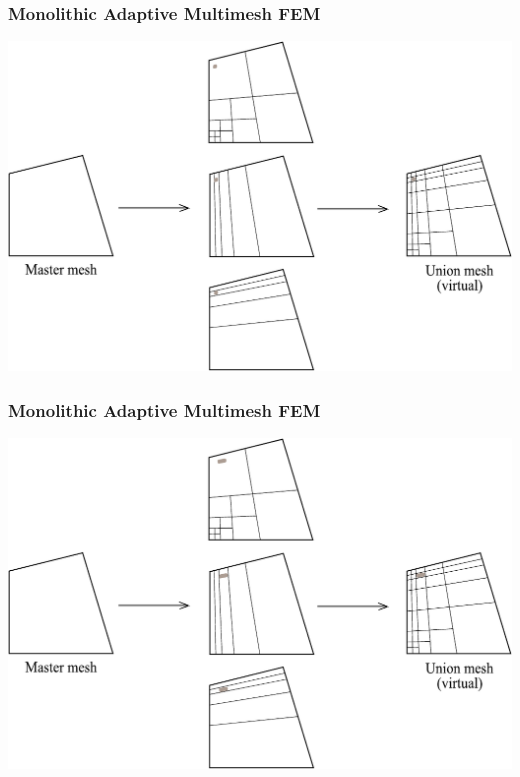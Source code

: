 \begin{frame}
  \frametitle{Monolithic Adaptive Multimesh FEM}
  \begin{center}
    \includegraphics[height=0.7\textheight]{multimesh/mm_26.pdf}
  \end{center}
\end{frame}

\begin{frame}
  \frametitle{Monolithic Adaptive Multimesh FEM}
  \begin{center}
    \includegraphics[height=0.7\textheight]{multimesh/mm_27.pdf}
  \end{center}
\end{frame}

